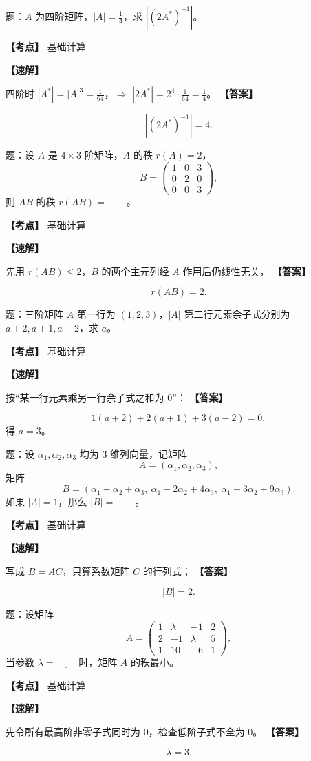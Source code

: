 ﻿\documentclass[11pt,a4paper,UTF8]{ctexart}
\begin{document}
\begin{answerbox}[2020--2021 填空 1]
题：$A$ 为四阶矩阵，$|A|=\frac14$，求 $|(2A^*)^{-1}|$。

\textbf{【考点】} 基础计算

\textbf{【速解】}

四阶时 $|A^*|=|A|^3=\frac1{64}$，$\Rightarrow$ $|2A^*|=2^4\cdot\frac1{64}=\frac14$。
\textbf{【答案】}

\[|(2A^*)^{-1}|=4.\]
\end{answerbox}
\begin{answerbox}[2020--2021 填空 2]
题：设 $A$ 是 $4\times3$ 阶矩阵，$A$ 的秩 $r(A)=2$，
\[
B=\begin{pmatrix}
1&0&3\\
0&2&0\\
0&0&3
\end{pmatrix},
\]
则 $AB$ 的秩 $r(AB)=\underline{\qquad}$。

\textbf{【考点】} 基础计算

\textbf{【速解】}

先用 $r(AB)\le 2$，$B$ 的两个主元列经 $A$ 作用后仍线性无关，
\textbf{【答案】}

\[r(AB)=2.\]
\end{answerbox}
\begin{answerbox}[2020--2021 填空 3]
题：三阶矩阵 $A$ 第一行为 $(1,2,3)$，$|A|$ 第二行元素余子式分别为 $a+2,a+1,a-2$，求 $a$。

\textbf{【考点】} 基础计算

\textbf{【速解】}

按“某一行元素乘另一行余子式之和为 $0$”：
\textbf{【答案】}

\[1(a+2)+2(a+1)+3(a-2)=0,\]
得 $a=3$。
\end{answerbox}
\begin{answerbox}[2021--2022 填空 1]
题：设 $\alpha_1,\alpha_2,\alpha_3$ 均为 $3$ 维列向量，记矩阵
\[
A=(\alpha_1,\alpha_2,\alpha_3),
\]
矩阵
\[
B=(\alpha_1+\alpha_2+\alpha_3,\ \alpha_1+2\alpha_2+4\alpha_3,\ \alpha_1+3\alpha_2+9\alpha_3).
\]
如果 $|A|=1$，那么 $|B|=\underline{\qquad}$。

\textbf{【考点】} 基础计算

\textbf{【速解】}

写成 $B=AC$，只算系数矩阵 $C$ 的行列式；
\textbf{【答案】}

\[|B|=2.\]
\end{answerbox}
\begin{answerbox}[2021--2022 填空 3]
题：设矩阵
\[
A=\begin{pmatrix}
1&\lambda&-1&2\\
2&-1&\lambda&5\\
1&10&-6&1
\end{pmatrix},
\]
当参数 $\lambda=\underline{\qquad}$ 时，矩阵 $A$ 的秩最小。

\textbf{【考点】} 基础计算

\textbf{【速解】}

先令所有最高阶非零子式同时为 $0$，检查低阶子式不全为 $0$。
\textbf{【答案】}

\[\lambda=3.\]
\end{answerbox}
\end{document}
